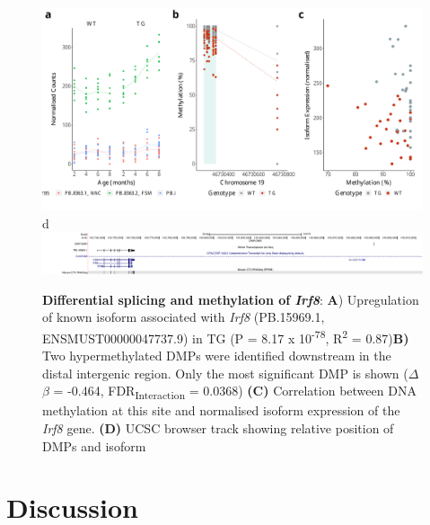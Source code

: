 \begin{figure}[]
	\includegraphics[page=5,scale = 0.4]{Figures/WholeDifferentialAnalysis_DMPDMR.pdf}
	\\
	\hspace*{0.2cm}\vspace{0.5cm}\large d
	\\
	\includegraphics[page=1,trim={1.5cm 0 0 0},scale = 0.9]{Figures/IRF8_DMP.pdf}
	\captionsetup{width=0.95\textwidth}
	\caption[Differential splicing and methylation of \textit{Irf8}]%
	{\textbf{Differential splicing and methylation of \textit{Irf8}}: \textbf{A}) Upregulation of known isoform associated with \textit{Irf8} (PB.15969.1, ENSMUST00000047737.9) in TG (P = 8.17 x 10\textsuperscript{-78}, R\textsuperscript{2} = 0.87)\textbf{B)} Two hypermethylated DMPs were identified downstream in the distal intergenic region. Only the most significant DMP is shown ($\Delta$$\beta$ = -0.464, FDR\textsubscript{Interaction} = 0.0368) \textbf{(C)} Correlation between DNA methylation at this site and normalised isoform expression of the \textit{Irf8} gene. \textbf{(D)} UCSC browser track showing relative position of DMPs and isoform}    
	\label{fig:IntMeth_Irf8}
\end{figure}



\clearpage
\section{Discussion}

